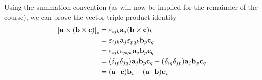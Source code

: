 Using the summation convention (as will now be implied for the remainder of the course), we can prove the vector triple product identity
\begin{align*}
	\left[ \vb a \times (\vb b \times \vb c) \right]_i
	 & = \varepsilon_{ijk} \vb a_j (\vb b \times \vb c)_k                                                  \\
	 & = \varepsilon_{ijk} \vb a_j \varepsilon_{pqk} \vb b_p \vb c_q                                       \\
	 & = \varepsilon_{ijk}\varepsilon_{pqk} \vb a_j \vb b_p \vb c_q                                        \\
	 & = (\delta_{ip}\delta_{jq})\vb a_j \vb b_p \vb c_q - (\delta_{iq}\delta_{jp})\vb a_j \vb b_p \vb c_q \\
	 & = (\vb a \cdot \vb c) \vb b_i - (\vb a \cdot \vb b) \vb c_i
\end{align*}
